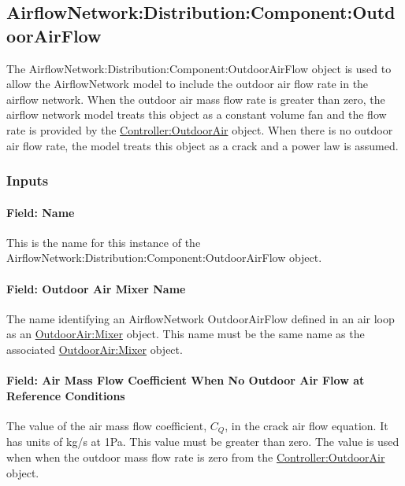\subsection{AirflowNetwork:Distribution:Component:OutdoorAirFlow}\label{airflowNetworkdistributioncomponentoutdoorairflow}

The AirflowNetwork:Distribution:Component:OutdoorAirFlow object is used to allow the AirflowNetwork model to include the outdoor air flow rate in the airflow network. When the outdoor air mass flow rate is greater than zero, the airflow network model treats this object as a constant volume fan and the flow rate is provided by the \hyperref[controlleroutdoorair]{Controller:OutdoorAir} object. When there is no outdoor air flow rate, the model treats this object as a crack and a power law is assumed.

\subsubsection{Inputs}\label{inputs-AFN-outdoorairflow}

\paragraph{Field: Name}\label{field-name-outdoorairflow}

This is the name for this instance of the AirflowNetwork:Distribution:Component:OutdoorAirFlow object.

\paragraph{Field: Outdoor Air Mixer Name}\label{field-name-outdoor-air-mixer}

The name identifying an AirflowNetwork OutdoorAirFlow defined in an air loop as an \hyperref[outdoorairmixer]{OutdoorAir:Mixer} object. This name must be the same name as the associated \hyperref[outdoorairmixer]{OutdoorAir:Mixer} object.

\paragraph{Field: Air Mass Flow Coefficient When No Outdoor Air Flow at Reference Conditions}\label{field-air-mass-flow-coefficient-when-no-outdoor-air-flow-at-reference-conditions}

The value of the air mass flow coefficient, \({C_Q}\), in the crack air flow equation. It has units of kg/s at 1Pa. This value must be greater than zero. The value is used when when the outdoor mass flow rate is zero from the \hyperref[controlleroutdoorair]{Controller:OutdoorAir} object.


